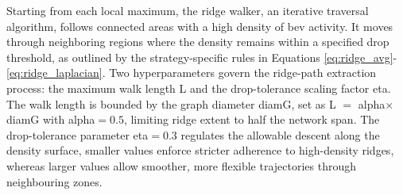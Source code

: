 Starting from each local maximum, the ridge walker, an iterative traversal algorithm, follows connected areas with a high density of \gls{bev} activity. It moves through neighboring regions where the density remains within a specified drop threshold, as outlined by the strategy-specific rules in Equations \eqref{eq:ridge_avg}-\eqref{eq:ridge_laplacian}. 
Two hyperparameters govern the ridge-path extraction process: the maximum walk length \gls{L} and the drop-tolerance scaling factor \gls{eta}. The walk length is bounded by the graph diameter \gls{diamG}, set as \gls{L} $ = $ \gls{alpha}$ \times $\gls{diamG} with \gls{alpha}$ = 0.5$, limiting ridge extent to half the network span. The drop-tolerance parameter \gls{eta}$ = 0.3$ regulates the allowable descent along the density surface, smaller values enforce stricter adherence to high-density ridges, whereas larger values allow smoother, more flexible trajectories through neighbouring zones.





